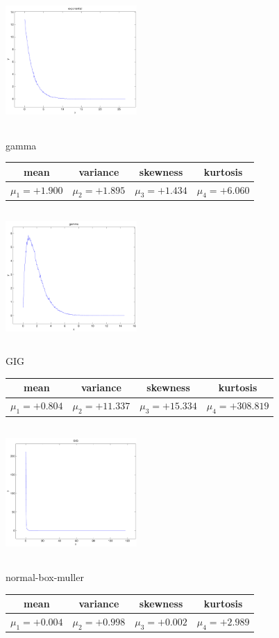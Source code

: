 \documentclass[12pt]{article}
\theoremstyle{definition}
\theoremstyle{remark}
\numberwithin{equation}{section}
\begin{document}
\includegraphics[width=5cm,height=5cm]{exponential.pdf}

\newpage
gamma \begin{tabular}{|c|c|c|c|}  mean & variance & skewness & kurtosis \\  \hline
$\mu_1 = +1.900$ & $\mu_2 = +1.895$ & $\mu_3 = +1.434$ & $\mu_4 =+6.060$ \\
\end{tabular}

\includegraphics[width=5cm,height=5cm]{gamma.pdf}

GIG \begin{tabular}{|c|c|c|c|}  mean & variance & skewness & kurtosis \\  \hline
$\mu_1 = +0.804$ & $\mu_2 = +11.337$ & $\mu_3 = +15.334$ & $\mu_4 =+308.819$ \\
\end{tabular}

\includegraphics[width=5cm,height=5cm]{GIG.pdf}

normal-box-muller \begin{tabular}{|c|c|c|c|}  mean & variance & skewness & kurtosis \\  \hline
$\mu_1 = +0.004$ & $\mu_2 = +0.998$ & $\mu_3 = +0.002$ & $\mu_4 =+2.989$ \\
\end{tabular}
\end{document}
